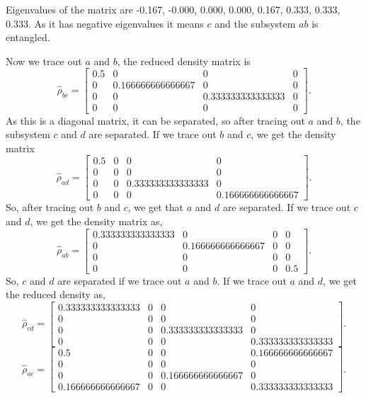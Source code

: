\documentclass{amsart}
\theoremstyle{plain}
\theoremstyle{definition}
\theoremstyle{plain}
\begin{document}
Eigenvalues of the matrix are -0.167, -0.000, 0.000, 0.000, 0.167, 0.333, 0.333, 0.333. As it has negative eigenvalues it means $c$ and the subsystem $ab$ is entangled.

Now we trace out $a$ and $b$, the reduced density matrix is 
\begin{equation*}
	\hat{\rho}_{bc} = \left[\begin{matrix}0.5 & 0 & 0 & 0\\0 & 0.166666666666667 & 0 & 0\\0 & 0 & 0.333333333333333 & 0\\0 & 0 & 0 & 0\end{matrix}\right]
	.
\end{equation*}
As this is a diagonal matrix, it can be separated, so after tracing out $a$ and $b$, the subsystem $c$ and $d$ are separated.
If we trace out $b$ and $c$, we get the density matrix
\begin{equation*}
	\hat{\rho}_{ad} =\left[\begin{matrix}0.5 & 0 & 0 & 0\\0 & 0 & 0 & 0\\0 & 0 & 0.333333333333333 & 0\\0 & 0 & 0 & 0.166666666666667\end{matrix}\right]
	.
\end{equation*}
So, after tracing out $b$ and $c$, we get that $a$ and $d$ are separated. 
If we trace out $c$ and $d$, we get the density matrix as,
\begin{equation*}
	\hat{\rho}_{ab} = \left[\begin{matrix}0.333333333333333 & 0 & 0 & 0\\0 & 0.166666666666667 & 0 & 0\\0 & 0 & 0 & 0\\0 & 0 & 0 & 0.5\end{matrix}\right]
	.
\end{equation*}
So, $c$ and $d$ are separated if we trace out $a$ and $b$.
If we trace out $a$ and  $d$, we get the reduced density as,
\begin{equation*}
	\hat{\rho}_{cd} = \left[\begin{matrix}0.333333333333333 & 0 & 0 & 0\\0 & 0 & 0 & 0\\0 & 0 & 0.333333333333333 & 0\\0 & 0 & 0 & 0.333333333333333\end{matrix}\right]
	.
\end{equation*}
\begin{equation*}
	\hat{\rho}_{ac} = \left[\begin{matrix}0.5 & 0 & 0 & 0.166666666666667\\0 & 0 & 0 & 0\\0 & 0 & 0.166666666666667 & 0\\0.166666666666667 & 0 & 0 & 0.333333333333333\end{matrix}\right]
	.
\end{equation*}
\end{document}
